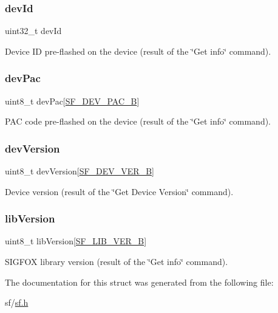 \subsubsection{\texorpdfstring{devId}{devId}}
{\footnotesize\ttfamily uint32\+\_\+t dev\+Id}

Device ID pre-\/flashed on the device (result of the \char`\"{}\+Get info\char`\"{} command). \mbox{\label{structsf__device__info__t_a83504145e622c48491257de6ace7761e}} 
\subsubsection{\texorpdfstring{devPac}{devPac}}
{\footnotesize\ttfamily uint8\+\_\+t dev\+Pac\mbox{[}\mbox{\hyperlink{sf__ol23xx_8h_af179cd7db055b975a8aa0543f469b4d3}{S\+F\+\_\+\+D\+E\+V\+\_\+\+P\+A\+C\+\_\+B}}\mbox{]}}

P\+AC code pre-\/flashed on the device (result of the \char`\"{}\+Get info\char`\"{} command). \mbox{\label{structsf__device__info__t_ae65c4b66c765a2eea9d2984339445d2d}} 
\subsubsection{\texorpdfstring{devVersion}{devVersion}}
{\footnotesize\ttfamily uint8\+\_\+t dev\+Version\mbox{[}\mbox{\hyperlink{sf__ol23xx_8h_afe852c9108ff2e80bf25b89f18369d16}{S\+F\+\_\+\+D\+E\+V\+\_\+\+V\+E\+R\+\_\+B}}\mbox{]}}

Device version (result of the \char`\"{}\+Get
            Device Version\char`\"{} command). \mbox{\label{structsf__device__info__t_a9c77882aef65c6db0fa1630190bda1d8}} 
\subsubsection{\texorpdfstring{libVersion}{libVersion}}
{\footnotesize\ttfamily uint8\+\_\+t lib\+Version\mbox{[}\mbox{\hyperlink{sf__ol23xx_8h_a2aec070a7f1b02738f4fe63ce66c5e1d}{S\+F\+\_\+\+L\+I\+B\+\_\+\+V\+E\+R\+\_\+B}}\mbox{]}}

S\+I\+G\+F\+OX library version (result of the \char`\"{}\+Get info\char`\"{} command). 

The documentation for this struct was generated from the following file\+:\begin{DoxyCompactItemize}
\item 
sf/\mbox{\hyperlink{sf_8h}{sf.\+h}}\end{DoxyCompactItemize}
